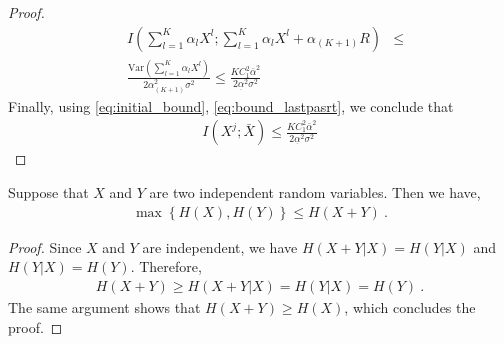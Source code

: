 \begin{proof}
\begin{align}
    &I\left( \sum_{l=1}^K \alpha_{l} X^l ; \sum_{l=1}^K \alpha_{l} X^l  + \alpha_{(K+1)} R\right)&\leq\nonumber\\ &\frac{\text{Var}\left( \sum_{l=1}^K \alpha_{l} X^l \right)}{2\alpha_{(K+1)}^2\sigma^2}\leq \frac{KC_1^2\bar{\alpha}^2}{2\underset{\bar{}}{\alpha}^2\sigma^2}
\end{align}
Finally, using \eqref{eq:initial_bound}, \eqref{eq:bound_lastpasrt}, we conclude that 
\begin{align}\label{eq:final_bound}
    I\left(X^j;\bar X\right)\leq\frac{KC_1^2\bar{\alpha}^2}{2\underset{\bar{}}{\alpha}^2\sigma^2}
\end{align}
\end{proof}
\begin{lemma}\label{lemma:indep_ineq}
Suppose that $X$ and $Y$ are two independent random variables. Then we have,
\begin{align}
\max \left\{ H(X),H(Y) \right\}   \leq H(X+Y)~.
\end{align}
\end{lemma}
\begin{proof}
Since $X$ and $Y$ are independent, we have $H(X+Y | X)=H(Y|X)$ and $H(Y|X)=H(Y)$. Therefore,
\begin{align}
    H(X+Y)\geq H(X+Y|X)=H(Y|X)=H(Y)~.
\end{align}
The same argument shows that $H(X+Y)\geq H(X)$, which concludes the proof.
\end{proof}

